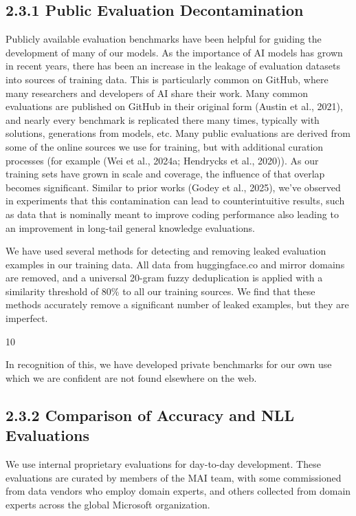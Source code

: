 \documentclass[
  10
]{article}
\begin{document}
\subsection{2.3.1 Public Evaluation
Decontamination}\label{public-evaluation-decontamination}

Publicly available evaluation benchmarks have been helpful for guiding
the development of many of our models. As the importance of AI models
has grown in recent years, there has been an increase in the leakage of
evaluation datasets into sources of training data. This is particularly
common on GitHub, where many researchers and developers of AI share
their work. Many common evaluations are published on GitHub in their
original form (Austin et al., 2021), and nearly every benchmark is
replicated there many times, typically with solutions, generations from
models, etc. Many public evaluations are derived from some of the online
sources we use for training, but with additional curation processes (for
example (Wei et al., 2024a; Hendrycks et al., 2020)). As our training
sets have grown in scale and coverage, the influence of that overlap
becomes significant. Similar to prior works (Godey et al., 2025), we've
observed in experiments that this contamination can lead to
counterintuitive results, such as data that is nominally meant to
improve coding performance also leading to an improvement in long-tail
general knowledge evaluations.

We have used several methods for detecting and removing leaked
evaluation examples in our training data. All data from huggingface.co
and mirror domains are removed, and a universal 20-gram fuzzy
deduplication is applied with a similarity threshold of 80\% to all our
training sources. We find that these methods accurately remove a
significant number of leaked examples, but they are imperfect.

10

In recognition of this, we have developed private benchmarks for our own
use which we are confident are not found elsewhere on the web.

\subsection{2.3.2 Comparison of Accuracy and NLL
Evaluations}\label{comparison-of-accuracy-and-nll-evaluations}

We use internal proprietary evaluations for day-to-day development.
These evaluations are curated by members of the MAI team, with some
commissioned from data vendors who employ domain experts, and others
collected from domain experts across the global Microsoft organization.
\end{document}
